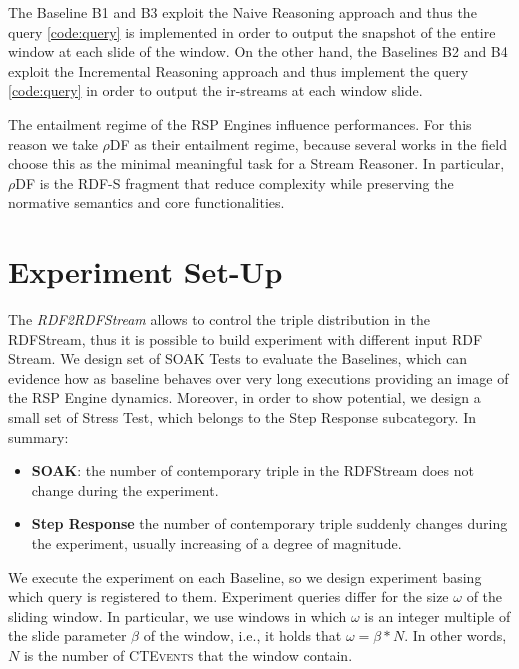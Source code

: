 The Baseline B1 and B3 exploit the Naive Reasoning approach and thus the query \ref{code:query} is implemented in order to output the snapshot of the entire window at each slide of the window. On the other hand, the Baselines B2 and B4 exploit the Incremental Reasoning approach and thus implement the query \ref{code:query} in order to output the ir-streams at each window slide.

The entailment regime of the RSP Engines influence performances. For this reason we take $\rho$DF  \cite{DBLP:conf/esws/MunozPG07} as their entailment regime, because several works in the field \cite{DBLP:conf/semweb/UrbaniMJHB13} choose this as the minimal meaningful task for a Stream Reasoner. In particular, $\rho$DF is the RDF-S fragment that reduce complexity while preserving the normative semantics and core functionalities.


\section{Experiment Set-Up}

The \textit{RDF2RDFStream} allows to control the triple distribution in the RDFStream, thus it is possible to build experiment with different input RDF Stream. We design set of SOAK Tests to evaluate the Baselines, which can evidence how as baseline behaves over very long executions providing an image of the RSP Engine dynamics. Moreover, in order to show \name potential, we design a small set of Stress Test, which belongs to the Step Response subcategory. In summary:

\begin{itemize}
\item \textbf{SOAK}: the number of contemporary triple in the RDFStream does not change during the experiment.
\item \textbf{Step Response} the number of contemporary triple suddenly changes during the experiment, usually increasing of a degree of magnitude.
\end{itemize}

We execute the experiment on each \name Baseline, so we design experiment basing which query is registered to them. Experiment queries differ for the size $\omega$ of the sliding window. In particular, we use windows in which $\omega$ is an integer multiple of the slide parameter $\beta$ of the window, i.e., it holds that $\omega = \beta * N$. In other words, $N$ is the number of \textsc{CTEvents} that the window contain. 

